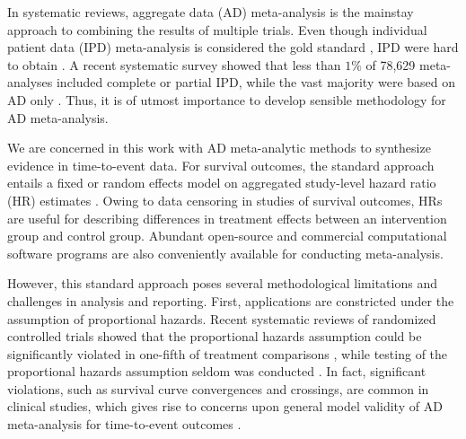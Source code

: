 \documentclass[12pt]{article}
\theoremstyle{mystyle}
\begin{document}
In systematic reviews, aggregate data (AD) meta-analysis is the mainstay approach to combining the results of multiple trials. Even though individual patient data (IPD) meta-analysis is considered the gold standard \citep{Stewart1995, Riley2010}, IPD were hard to obtain \citep{Tierney2015, Marciniak2017}.  A recent systematic survey showed that less than $1\%$ of 78,629 meta-analyses included complete or partial IPD, while the vast majority were based on AD only \citep{Nevitt2017}.  Thus, it is of utmost importance to develop sensible methodology for AD meta-analysis. 

We are concerned in this work with AD meta-analytic methods to synthesize evidence in time-to-event data. For survival outcomes, the standard approach entails a fixed or random effects model
on aggregated study-level hazard ratio (HR) estimates \citep{Moher2010, Higgins2020}.  
Owing to data censoring in studies of survival outcomes, HRs are useful for describing differences in treatment effects between an intervention group and control group.
Abundant open-source and commercial computational software programs are also conveniently available for conducting meta-analysis.   

However, this standard approach poses several methodological limitations and challenges in analysis and reporting. 
First, applications are constricted under the assumption of proportional hazards.  Recent systematic reviews of randomized controlled trials showed that the proportional hazards assumption could be significantly violated in one-fifth of treatment comparisons \citep{Rulli2018}, while testing of the proportional hazards assumption seldom was conducted \citep{batson2016review}. In fact, significant violations, such as survival curve convergences and crossings, are common in clinical studies,  which gives rise to concerns upon general model validity
of AD meta-analysis for time-to-event outcomes  \citep{Kristiansen2012}. 
\end{document}
